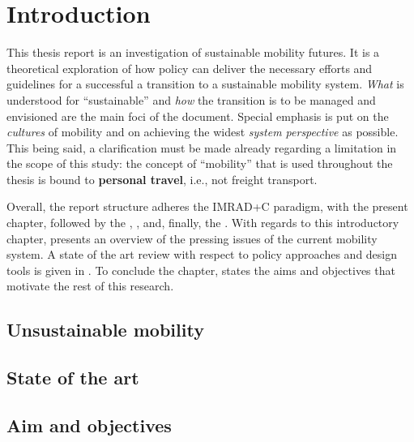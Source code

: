 \chapter{Introduction}
\label{c:introduction}

This thesis report is an investigation of sustainable mobility futures. It is a theoretical exploration of how policy can deliver the necessary efforts and guidelines for a successful a transition to a sustainable mobility system. \emph{What} is understood for ``sustainable'' and \emph{how} the transition is to be managed and envisioned are the main foci of the document. Special emphasis is put on the \emph{cultures} of mobility and on achieving the widest \emph{system perspective} as possible. This being said, a clarification must be made already regarding a limitation in the scope of this study: the concept of ``mobility'' that is used throughout the thesis is bound to \textbf{personal travel}, i.e., not freight transport.

Overall, the report structure adheres the IMRAD+C paradigm, with the present  chapter, followed by the , ,  and, finally, the . With regards to this introductory chapter,  presents an overview of the pressing issues of the current mobility system. A state of the art review with respect to policy approaches and design tools is given in . To conclude the chapter,  states the aims and objectives that motivate the rest of this research.

\section{Unsustainable mobility}
\label{s:intro:unsustainable-mobility}


\section{State of the art}
\label{s:intro:state-of-art}


\section{Aim and objectives}
\label{s:intro:aim-objectives}
